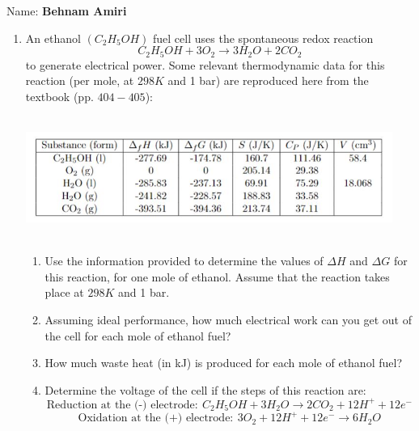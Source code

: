 \documentclass[fleqn]{article}
\begin{document}
  Name: \textbf{Behnam Amiri}

  \vspace{1cm}



  \begin{enumerate}
    \item An ethanol $(C_2 H_5 OH)$ fuel cell uses the spontaneous redox reaction
    $$
      C_2 H_5 OH+3O_2 \longrightarrow 3 H_2O+2CO_2
    $$
    to generate electrical power. Some relevant thermodynamic data for this reaction (per mole,
    at $298 K$ and 1 bar) are reproduced here from the textbook (pp. $404-405$):
    \begin{center}
      \includegraphics[height=4cm, width=12cm]{1.JPG}
    \end{center}
    \begin{enumerate}
      \item Use the information provided to determine the values of $\Delta H$ and $\Delta G$ for this reaction, for
      one mole of ethanol. Assume that the reaction takes place at $298 K$ and 1 bar.


      \item Assuming ideal performance, how much electrical work can you get out of the cell for each
      mole of ethanol fuel?


      \item How much waste heat (in kJ) is produced for each mole of ethanol fuel?


      \item Determine the voltage of the cell if the steps of this reaction are:
      $$
        \text{Reduction at the (-) electrode}: ~ C_2 H_5 OH + 3 H_2 O \longrightarrow 2 CO_2 + 12H^+ + 12e^-
      $$
      $$
        \text{Oxidation at the (+) electrode}: ~ 3O_2 + 12H^+ +12 e^- \longrightarrow 6H_2 O
      $$


\end{enumerate}
\end{enumerate}
\end{document}
